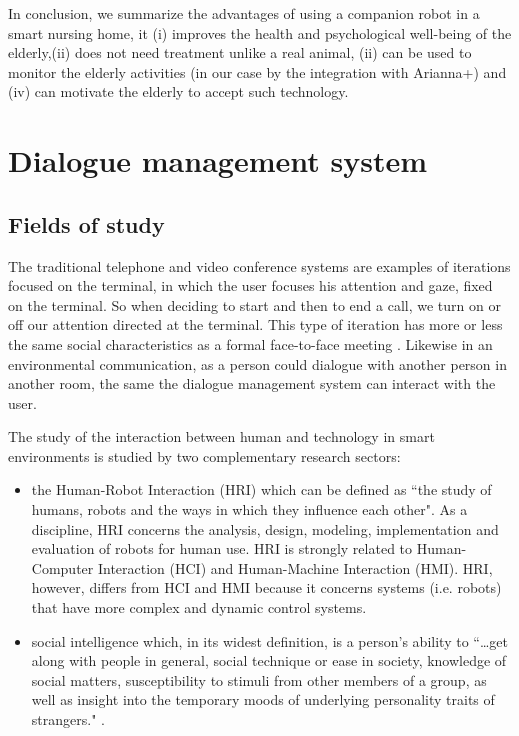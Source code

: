 \documentclass{thesisreport}
\begin{document}
In conclusion, we summarize the advantages of using a companion robot in a smart nursing home, it (i) improves the health and psychological well-being of the elderly,(ii) does not need treatment unlike a real animal, (ii) can be used to monitor the elderly activities (in our case by the integration with Arianna+) and (iv) can motivate the elderly to accept such technology.

 \section{Dialogue management system} \label{speech}
 \subsection{Fields of study}
 The traditional telephone and video conference systems are examples of iterations focused on the terminal, in which the user focuses his attention and gaze, fixed on the terminal. So when deciding to start and then to end a call, we turn on or off our attention directed at the terminal. This type of iteration has more or less the same social characteristics as a formal face-to-face meeting \cite{augusto2010ambient}.
 Likewise in an environmental communication, as a person could dialogue with another person in another room, the same the dialogue management system can interact with the  user.
 
 The study of the interaction between human and technology in smart environments is studied by two complementary research sectors:
 \begin{itemize}
    \item the Human-Robot Interaction (HRI) which can be defined as ``the study of humans, robots and the ways in which they influence each other". As a discipline, HRI concerns the analysis, design, modeling, implementation and evaluation of robots for human use.
    HRI is strongly related to Human-Computer Interaction (HCI) and Human-Machine Interaction (HMI). HRI, however, differs from HCI and HMI because it concerns systems (i.e. robots) that have more complex and dynamic control systems.
     
    \item social intelligence which, in its widest definition, is a person's ability to ``\dots get along with people in general, social technique or ease in society, knowledge of social matters, susceptibility to stimuli from other members of a group, as well as insight into the temporary moods of underlying personality traits of strangers." \cite{vernon1933some}.
 \end{itemize}
\end{document}
